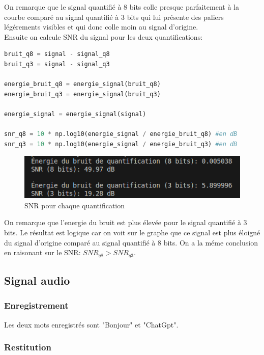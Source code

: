 On remarque que le signal quantifié à 8 bits colle presque parfaitement à la courbe comparé au signal quantifié à 3 bits qui lui présente des paliers légérements visibles et qui donc colle moin au signal d'origine.\\ 

Ensuite on calcule SNR du signal pour les deux quantifications:

\begin{lstlisting}[language=python]
bruit_q8 = signal - signal_q8
bruit_q3 = signal - signal_q3

energie_bruit_q8 = energie_signal(bruit_q8)
energie_bruit_q3 = energie_signal(bruit_q3)

energie_signal = energie_signal(signal)

snr_q8 = 10 * np.log10(energie_signal / energie_bruit_q8) #en dB
snr_q3 = 10 * np.log10(energie_signal / energie_bruit_q3) #en dB
\end{lstlisting}

\begin{figure}[!h]
\begin{center}
\includegraphics{screenshots/snr_quantification.png}
\end{center}
\caption{SNR pour chaque quantification}
\end{figure} 

On remarque que l'energie du bruit est plus élevée pour le signal quantifié à 3 bits. Le résultat est logique car on voit sur le graphe que ce signal est plus éloigné du signal d'origine comparé au signal quantifié à 8 bits. On a la méme conclusion en raisonant sur le SNR: $SNR_{q8} > SNR_{q3}$.

\subsection{Signal audio}

\subsubsection{Enregistrement}

Les deux mots enregistrés sont "Bonjour" et "ChatGpt".

\subsubsection{Restitution}

